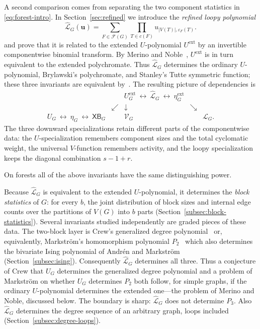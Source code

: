 \documentclass[11pt]{article}
\theoremstyle{plain}
\theoremstyle{definition}
\renewcommand{\mathcal}{\mathscr}
\newcommand{\LL}{\mathcal{L}}    %
\newcommand{\cF}{\mathcal{F}}    %
\newcommand{\cV}{\mathcal{V}}    %
\newcommand{\bu}{\mathbf{u}}
\newcommand{\XB}{\mathsf{XB}} %
\newcommand{\eps}{\varepsilon}
\newcommand{\ext}{\mathrm{ext}}
\numberwithin{equation}{section}
\begin{document}
A second comparison comes from separating the two component statistics in \eqref{eq:forest-intro}.
In Section~\ref{sec:refined} we introduce the \emph{refined loopy polynomial}
\[
   \widehat{\LL}_G(\bu)
   =
   \sum_{F\in\cF(G)}
   \prod_{T\in c(F)}u_{|V(T)|,\eps_F(T)}.
 \]
 and prove that it
is related to the extended $U$-polynomial $U^\ext$ by an invertible componentwise binomial transform.
By Merino and Noble~\cite{MN}, $U^\ext$ is in turn
equivalent to the extended polychromate.
Thus $\widehat{\LL}_G$ determines the ordinary $U$-polynomial, Brylawski's polychromate, and Stanley's Tutte symmetric function; these three invariants are equivalent by~\cite{NW,Sar,MN,Nob}.
The resulting picture of dependencies is
\begin{equation}\label{eq:common-diagram-intro}
\begin{array}{ccccc}
&& U_G^{\ext}\ \longleftrightarrow\ \widehat{\LL}_G
   \ \longleftrightarrow\ \eta_G^{\ext} &&\\[2mm]
& \swarrow & \downarrow & \searrow &\\[-1mm]
U_G\ \longleftrightarrow\ \eta_G\ \longleftrightarrow\ \XB_G
& & \cV_G & & \LL_G .
\end{array}
\end{equation}
The three downward specializations retain different parts of the componentwise data: the $U$-specialization remembers component sizes and the total cyclomatic weight, the universal $V$-function remembers activity, and the loopy specialization keeps the diagonal combination $s-1+r$.

On forests all of the above invariants have the same distinguishing power.
\medskip

Because $\widehat{\LL}_G$ is equivalent to the extended $U$-polynomial, it determines the \emph{block statistics} of $G$: for every $b$, the joint
distribution of block sizes and internal edge counts over the partitions of $V(G)$ into $b$ parts (Section~\ref{subsec:block-statistics}).  Several
invariants studied independently are graded pieces of these data.
The two-block layer is Crew's generalized degree polynomial~\cite{Crew} or,
equivalently, Markstr\"om's homomorphism polynomial $P_2$~\cite{Mar} which also determines
the bivariate Ising polynomial of Andr\'en and Markstr\"om~\cite{AM} (Section~\ref{subsec:ising}).
Consequently $\widehat{\LL}_G$ determines all three.
Thus a conjecture of Crew that $U_G$ determines the generalized degree polynomial
and a problem of Markstr\"om on whether $U_G$ determines $P_2$
both follow, for simple graphs, if the ordinary $U$-polynomial determines the extended
one---the problem of Merino and Noble, discussed below. The boundary is sharp:
$\widehat{\LL}_G$ does not determine $P_3$. Also $\widehat{\LL}_G$ determines
the degree sequence of an arbitrary graph, loops included (Section~\ref{subsec:degree-loops}).
\end{document}
